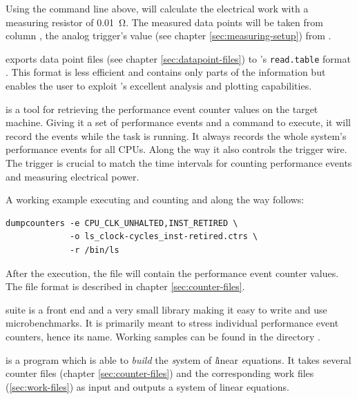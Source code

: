 Using the command line above, \JWTfcw{} will calculate the electrical work with
a measuring resistor of \SI{0.01}{\ohm}. The measured data points will be taken
from column , the analog trigger's value (see chapter
\ref{sec:measuring-setup}) from .


\JWlfour{\JWTde{}}

\JWTde{} exports data point files (see chapter \ref{sec:datapoint-files}) to
\JWTR{}'s \texttt{read.table} format \cite{r11data}. This format is less
efficient and contains only parts of the information but enables the user to
exploit \JWTR{}'s excellent analysis and plotting capabilities.


\JWlfour{\JWTdc{}}

\JWTdc{} is a tool for retrieving the performance event counter values on the
target machine. Giving it a set of performance events and a command to execute,
it will record the events while the task is running. It always records the whole
system's performance events for all CPUs. Along the way it also controls the
trigger wire. The trigger is crucial to match the time intervals for
counting performance events and measuring electrical power.

A working example executing  and counting
\JWctrCLK{} and \JWctrINST{} along the way follows:

\begin{lstlisting}[style=Shell]
dumpcounters -e CPU_CLK_UNHALTED,INST_RETIRED \
             -o ls_clock-cycles_inst-retired.ctrs \
             -r /bin/ls
\end{lstlisting}

After the execution, the file  will
contain the performance event counter values. The file format is described in
chapter \ref{sec:counter-files}.



\JWTcbs{} suite is a front end and a very small library making it easy to write
and use microbenchmarks.  It is primarily meant to stress individual performance
event counters, hence its name. Working samples can be found in the directory
\JWpath{ctrbenchmark/benchlets/}.


\JWlfour{\JWTbsle}

\JWTbsle{} is a  program which is able
to \emph{build} the \emph{s}ystem of \emph{l}inear \emph{e}quations. It takes
several counter files (chapter \ref{sec:counter-files}) and the corresponding
work files (\ref{sec:work-files}) as input and outputs a system of linear
equations.


